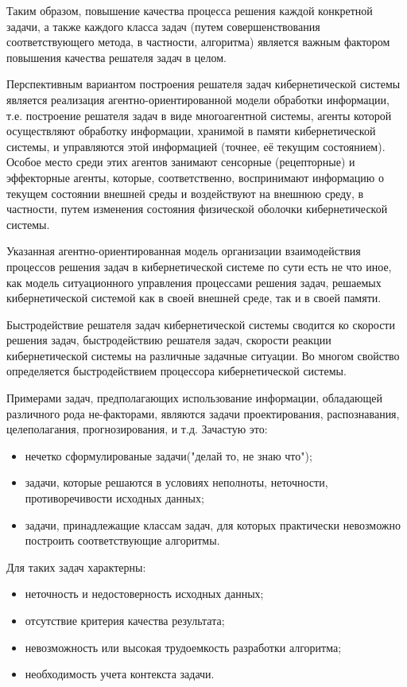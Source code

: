 Таким образом, повышение качества процесса решения каждой конкретной задачи, а также каждого класса задач (путем совершенствования соответствующего метода, в частности, алгоритма) является важным фактором повышения качества решателя задач в целом.

Перспективным вариантом построения решателя задач кибернетической системы является реализация агентно-ориентированной модели обработки информации, т.е. построение решателя задач в виде многоагентной системы, агенты которой осуществляют обработку информации, хранимой в памяти кибернетической системы, и управляются этой информацией (точнее, её текущим состоянием). 
Особое место среди этих агентов занимают сенсорные (рецепторные) и эффекторные агенты, которые, соответственно, воспринимают информацию о текущем состоянии внешней среды и воздействуют на внешнюю среду, в частности, путем изменения состояния физической оболочки кибернетической системы.

Указанная агентно-ориентированная модель организации взаимодействия процессов решения задач в кибернетической системе по сути есть не что иное, как модель ситуационного управления процессами решения задач, решаемых кибернетической системой как в своей внешней среде, так и в своей памяти.

Быстродействие решателя задач кибернетической системы сводится ко скорости решения задач, быстродействию решателя задач, скорости реакции кибернетической системы на различные задачные ситуации.
Во многом свойство определяется быстродействием процессора кибернетической системы.

Примерами задач, предполагающих использование информации, обладающей различного рода не-факторами, являются задачи проектирования, распознавания, целеполагания, прогнозирования, и т.д. Зачастую это:
\begin{itemize}
    \item{нечетко сформулированые задачи("делай то, не знаю что");}
    \item{задачи, которые решаются в условиях неполноты, неточности, противоречивости исходных данных;}
    \item{задачи, принадлежащие классам задач, для которых практически невозможно построить соответствующие алгоритмы.}
\end{itemize}
Для таких задач характерны:
\begin{itemize}
    \item{неточность и недостоверность исходных данных;}
    \item{отсутствие критерия качества результата;}
    \item{невозможность или высокая трудоемкость разработки алгоритма;}
    \item{необходимость учета контекста задачи.}
\end{itemize}

